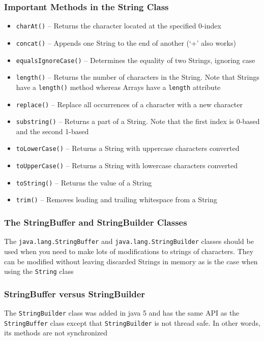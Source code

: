 \subsubsection{Important Methods in the String Class}
\begin{itemize}
    \item \verb#charAt()# -- Returns the character located at the specified 
    0-index
    \item \verb#concat()# -- Appends one String to the end of another (`+' also 
    works)
    \item \verb#equalsIgnoreCase()# -- Determines the equality of two Strings, 
    ignoring case
    \item \verb#length()# -- Returns the number of characters in the String.  
    Note that Strings have a \verb#length()# method whereas Arrays have a 
    \verb#length# attribute
    \item \verb#replace()# -- Replace all occurrences of a character with a new 
    character
    \item \verb#substring()# -- Returns a part of a String. Note that the first 
    index is 0-based and the second 1-based
    \item \verb#toLowerCase()# -- Returns a String with uppercase characters 
    converted
    \item \verb#toUpperCase()# -- Returns a String with lowercase characters 
    converted
    \item \verb#toString()# -- Returns the value of a String
    \item \verb#trim()# -- Removes leading and trailing whitespace from a 
    String
\end{itemize}

\subsubsection{The StringBuffer and StringBuilder Classes}
The \verb#java.lang.StringBuffer# and \verb#java.lang.StringBuilder# classes 
should be used when you need to make lots of modifications to strings of 
characters. They can be modified without leaving discarded Strings in memory as 
is the case when using the \verb#String# class

\subsubsection{StringBuffer versus StringBuilder}
The \verb#StringBuilder# class was added in java 5 and has the same API as the 
\verb#StringBuffer# class except that \verb#StringBuilder# is not thread safe.  
In other words, its methods are not synchronized

